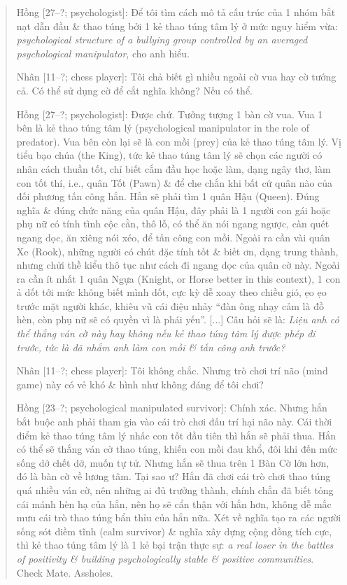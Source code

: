 \documentclass[12pt,twoside]{book}
\begin{document}
\begin{quote}
	{\sf Hồng [27--?; psychologist]}: Để tôi tìm cách mô tả cấu trúc của 1 nhóm bắt nạt dẫn đầu \& thao túng bởi 1 kẻ thao túng tâm lý ở mức nguy hiểm vừa: {\it psychological structure of a bullying group controlled by an averaged psychological manipulator}, cho anh hiểu.
	
	{\sf Nhân [11--?; chess player]}: Tôi chả biết gì nhiều ngoài cờ vua hay cờ tướng cả. Có thể sử dụng cờ để cắt nghĩa không? Nếu có thể.
	
	{\sf Hồng [27--?; psychologist]}: Được chứ. Tưởng tượng 1 bàn cờ vua. Vua 1 bên là kẻ thao túng tâm lý (psychological manipulator in the role of predator). Vua bên còn lại sẽ là con mồi (prey) của kẻ thao túng tâm lý. Vị tiểu bạo chúa (the King), tức kẻ thao túng tâm lý sẽ chọn các người có nhân cách thuần tốt, chỉ biết cắm đầu học hoặc làm, dạng ngây thơ, làm con tốt thí, i.e., quân Tốt (Pawn) \& để che chắn khi bất cứ quân nào của đối phương tấn công hắn. Hắn sẽ phải tìm 1 quân Hậu (Queen). Đúng nghĩa \& đúng chức năng của quân Hậu, đây phải là 1 người con gái hoặc phụ nữ có tính tình cộc cằn, thô lỗ, có thể ăn nói ngang ngược, càn quét ngang dọc, ăn xiêng nói xéo, để tấn công con mồi. Ngoài ra cần vài quân Xe (Rook), những người có chút đặc tính tốt \& biết ơn, dạng trung thành, nhưng chửi thề kiểu thô tục như cách đi ngang dọc của quân cờ này. Ngoài ra cần ít nhất 1 quân Ngựa (Knight, or Horse better in this context), 1 con ả dốt tới mức không biết mình dốt, cực kỳ dễ xoay theo chiều gió, ẹo ẹo trước mặt người khác, khiêu vũ cái điệu nhảy ``đàn ông nhạy cảm là đồ hèn, còn phụ nữ sẽ có quyền vì là phái yếu''. [...] Câu hỏi sẽ là: {\it Liệu anh có thể thắng ván cờ này hay không nếu kẻ thao túng tâm lý được phép đi trước, tức là đã nhắm anh làm con mồi \& tấn công anh trước?}
	
	{\sf Nhân [11--?; chess player]}: Tôi không chắc. Nhưng trò chơi trí não (mind game) này có vẻ khó \& hình như không đáng để tôi chơi?
	
	{\sf Hồng [23--?; psychological manipulated survivor]}: Chính xác. Nhưng hắn bắt buộc anh phải tham gia vào cái trò chơi đấu trí hại não này. Cái thời điểm kẻ thao túng tâm lý nhấc con tốt đầu tiên thì hắn sẽ phải thua. Hắn có thể sẽ thắng ván cờ thao túng, khiến con mồi đau khổ, đôi khi đến mức sống dở chết dở, muốn tự tử. Nhưng hắn sẽ thua trên 1 Bàn Cờ lớn hơn, đó là bàn cờ về lương tâm. Tại sao ư? Hắn đã chơi cái trò chơi thao túng quá nhiều ván cờ, nên những ai đủ trưởng thành, chính chắn đã biết tỏng cái mánh hèn hạ của hắn, nên họ sẽ cẩn thận với hắn hơn, không dễ mắc mưu cái trò thao túng bẩn thỉu của hắn nữa. Xét về nghĩa tạo ra các người sống sót điềm tĩnh (calm survivor) \& nghĩa xây dựng cộng đồng tích cực, thì kẻ thao túng tâm lý là 1 kẻ bại trận thực sự: {\it a real loser in the battles of positivity \& building psychologically stable \& positive communities}. Check Mate. Assholes.
\end{quote}
\end{document}
